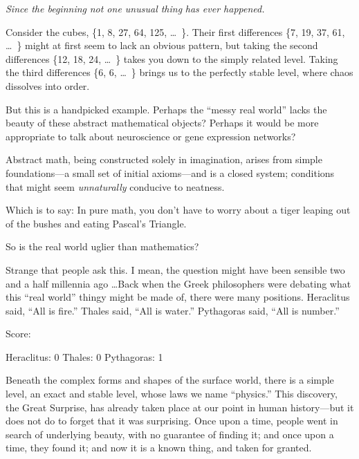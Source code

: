 {
 \textit{Since the beginning}\newline
\textit{ not one unusual thing}\newline
\textit{ has ever happened.}}

\myendsectiontext


{
 Consider the cubes, \{1, 8, 27,
64, 125, \ldots~\}. Their first
differences \{7, 19, 37, 61,
\ldots~\} might at first seem to lack
an obvious pattern, but taking the second differences
\{12, 18, 24,
\ldots~\} takes you down to the simply
related level. Taking the third differences
\{6, 6,
\ldots~\} brings us to the perfectly
stable level, where chaos dissolves into order. }

{
 But this is a handpicked example. Perhaps the
``messy real world'' lacks the
beauty of these abstract mathematical objects? Perhaps it would be more
appropriate to talk about neuroscience or gene expression networks?}

{
 Abstract math, being constructed solely in imagination, arises
from simple foundations---a small set of initial axioms---and is a
closed system; conditions that might seem \textit{unnaturally}
conducive to neatness.}

{
 Which is to say: In pure math, you don't have to
worry about a tiger leaping out of the bushes and eating
Pascal's Triangle.}

{
 So is the real world uglier than mathematics?}

{
 Strange that people ask this. I mean, the question might have been
sensible two and a half millennia ago \ldots Back when the Greek
philosophers were debating what this ``real
world'' thingy might be made of, there were many
positions. Heraclitus said, ``All is
fire.'' Thales said, ``All is
water.'' Pythagoras said, ``All is
number.''}

{
 Score:}

{\centering
 Heraclitus: 0\newline
 Thales: 0\newline
 Pythagoras: 1
\par}


\bigskip

{
 Beneath the complex forms and shapes of the surface world, there
is a simple level, an exact and stable level, whose laws we name
``physics.'' This discovery, the
Great Surprise, has already taken place at our point in human
history---but it does not do to forget that it was surprising. Once
upon a time, people went in search of underlying beauty, with no
guarantee of finding it; and once upon a time, they found it; and now
it is a known thing, and taken for granted.}


